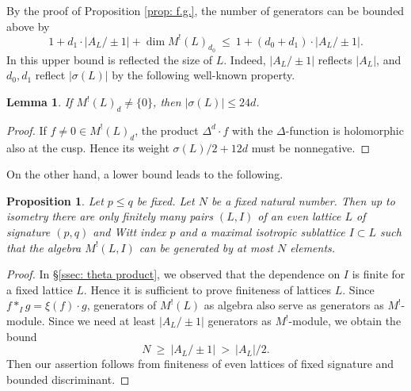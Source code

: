 \documentclass[12pt]{amsart}
\numberwithin{equation}{section}
\newtheorem{proposition}[theorem]{Proposition}
\newtheorem{lemma}[theorem]{Lemma}
\theoremstyle{definition}
\theoremstyle{remark}
\newcommand{\ML}{M^{!}(L)}
\begin{document}
By the proof of Proposition \ref{prop: f.g.}, 
the number of generators can be bounded above by 
\begin{equation*}\label{eqn: bound generator}
1 + d_{1}\cdot |A_{L}/\pm 1| + \dim M^!(L)_{d_{0}} 
\: \leq \: 
1+(d_0+d_1)\cdot |A_{L}/\pm 1|.   
\end{equation*}
In this upper bound is reflected the size of $L$. 
Indeed, $|A_{L}/\pm 1|$ reflects $|A_{L}|$, and 
$d_{0}, d_{1}$ reflect $|\sigma(L)|$ by the following well-known property. 

\begin{lemma}\label{lem: sgn bound}
If $M^!(L)_{d}\ne \{ 0 \}$, then $|\sigma(L)|\leq 24d$. 
\end{lemma}

\begin{proof}
If $f\ne 0 \in M^!(L)_{d}$, 
the product $\Delta^{d}\cdot f$ with the $\Delta$-function is holomorphic also at the cusp. 
Hence its weight $\sigma(L)/2+12d$ must be nonnegative. 
\end{proof}



On the other hand, a lower bound leads to the following. 

\begin{proposition}\label{prop: finiteness}
Let $p\leq q$ be fixed. 
Let $N$ be a fixed natural number. 
Then up to isometry 
there are only finitely many pairs $(L, I)$ 
of an even lattice $L$ of signature $(p, q)$ and Witt index $p$ 
and a maximal isotropic sublattice $I\subset L$ such that 
the algebra $M^!(L, I)$ can be generated by at most $N$ elements. 
\end{proposition}

\begin{proof}
In \S \ref{ssec: theta product}, we observed that 
the dependence on $I$ is finite for a fixed lattice $L$. 
Hence it is sufficient to prove finiteness of lattices $L$. 
Since $f\ast_{I}g=\xi(f)\cdot g$, 
generators of ${\ML}$ as algebra 
also serve as generators as $M^!$-module. 
Since we need at least $|A_{L}/\pm 1|$ generators as $M^!$-module, 
we obtain the bound 
\begin{equation*}
N \: \geq \: |A_{L}/\pm 1| \: > \: |A_{L}|/2. 
\end{equation*}
Then our assertion follows from 
finiteness of even lattices of fixed signature and bounded discriminant. 
\end{proof}
\end{document}
